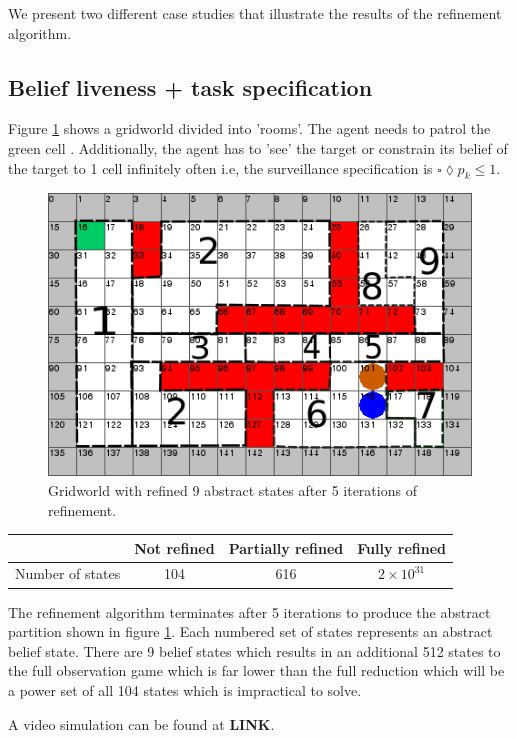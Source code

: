 We present two different case studies that illustrate the results of the refinement algorithm. 

\subsection{Belief liveness + task specification}
Figure \ref{fig:case1} shows a gridworld divided into 'rooms'. The agent needs to patrol the green cell . Additionally, the agent has to 'see' the target or constrain its belief of the target to 1 cell infinitely often i.e, the surveillance specification is $\square \lozenge p_k \leq 1$.

\begin{figure}
\centering
\includegraphics[scale=0.5]{text970.png}\caption{Gridworld with refined 9 abstract states after 5 iterations of refinement.}\label{fig:case1}
\end{figure}

\begin{table}[h!]
\begin{tabular}{c|c|c|c}
& Not refined & Partially refined & Fully refined \\ \hline \hline
Number of states & 104 & 616 & $2\times10^{31}$
\end{tabular}
\end{table}
The refinement algorithm terminates after 5 iterations to produce the abstract partition shown in figure \ref{fig:case1}. Each numbered set of states represents an abstract belief state. There are 9 belief states which results in an additional 512 states to the full observation game which is far lower than the full reduction which will be a power set of all 104 states which is impractical to solve.  

 A video simulation can be found at \textbf{LINK}. 


